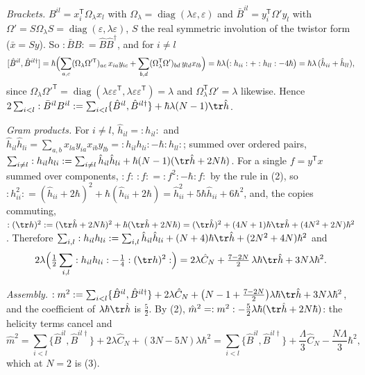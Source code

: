 \emph{Brackets.} $B^{il} = x_{i}^{\mathsf T}\Omega_{\lambda}x_{l}$ with $\Omega_{\lambda} = \operatorname{diag}(\lambda\varepsilon, \varepsilon)$ and $\bar{B}^{il} = y_{i}^{\mathsf T}\Omega'y_{l}$ with $\Omega' = S\Omega_{\lambda}S = \operatorname{diag}(\varepsilon, \lambda\varepsilon)$, $S$ the real symmetric involution of the twistor form ($\bar{x} = Sy$). So $:\bar{B}B: = \hat{B}\hat{B}^{\dagger}$, and for $i \ne l$
\[
[\hat{B}^{il}, \hat{B}^{il\dagger}] = \hbar\Bigl(\sum_{a,c}(\Omega_{\lambda}\Omega'^{\mathsf T})_{ac}\,x_{ia}y_{ic} + \sum_{b,d}(\Omega_{\lambda}^{\mathsf T}\Omega')_{bd}\,y_{ld}x_{lb}\Bigr) = \hbar\lambda\bigl(:h_{ii}: + :h_{ll}: - 4\hbar\bigr) = \hbar\lambda\,(\hat{h}_{ii} + \hat{h}_{ll}),
\]
since $\Omega_{\lambda}\Omega'^{\mathsf T} = \operatorname{diag}(\lambda\varepsilon\varepsilon^{\mathsf T}, \lambda\varepsilon\varepsilon^{\mathsf T}) = \lambda$ and $\Omega_{\lambda}^{\mathsf T}\Omega' = \lambda$ likewise. Hence $2\sum_{i<l}:\bar{B}^{il}B^{il}: = \sum_{i<l}\{\hat{B}^{il}, \hat{B}^{il\dagger}\} + \hbar\lambda(N - 1)\tr\hat{h}$.

\emph{Gram products.} For $i \ne l$, $\hat{h}_{il} = :h_{il}:$ and $\hat{h}_{il}\hat{h}_{li} = \sum_{a,b}x_{la}y_{ia}x_{ib}y_{lb} = :h_{il}h_{li}: - \hbar:h_{ll}:$; summed over ordered pairs, $\sum_{i\ne l}:h_{il}h_{li}: = \sum_{i\ne l}\hat{h}_{il}\hat{h}_{li} + \hbar(N - 1)(\tr\hat{h} + 2N\hbar)$. For a single $f = y^{\mathsf T}x$ summed over components, $:f:\,:f: = :f^{2}: - \hbar:f:$ by the rule in (2), so $:h_{ii}^{2}: = (\hat{h}_{ii} + 2\hbar)^{2} + \hbar(\hat{h}_{ii} + 2\hbar) = \hat{h}_{ii}^{2} + 5\hbar\hat{h}_{ii} + 6\hbar^{2}$, and, the copies commuting, $:(\tr h)^{2}: = (\tr\hat{h} + 2N\hbar)^{2} + \hbar(\tr\hat{h} + 2N\hbar) = (\tr\hat{h})^{2} + (4N + 1)\hbar\tr\hat{h} + (4N^{2} + 2N)\hbar^{2}$. Therefore $\sum_{i,l}:h_{il}h_{li}: = \sum_{i,l}\hat{h}_{il}\hat{h}_{li} + (N + 4)\hbar\tr\hat{h} + (2N^{2} + 4N)\hbar^{2}$ and
\[
2\lambda\Bigl(\tfrac12\sum_{i,l}:h_{il}h_{li}: - \tfrac14:(\tr h)^{2}:\Bigr) = 2\lambda\hat{C}_{N} + \tfrac{7 - 2N}{2}\,\lambda\hbar\tr\hat{h} + 3N\lambda\hbar^{2}.
\]

\emph{Assembly.} $:m^{2}: = \sum_{i<l}\{\hat{B}^{il}, \hat{B}^{il\dagger}\} + 2\lambda\hat{C}_{N} + \bigl(N - 1 + \tfrac{7 - 2N}{2}\bigr)\lambda\hbar\tr\hat{h} + 3N\lambda\hbar^{2}$, and the coefficient of $\lambda\hbar\tr\hat{h}$ is $\tfrac52$. By (2), $\hat{m}^{2} = :m^{2}: - \tfrac52\lambda\hbar(\tr\hat{h} + 2N\hbar)$: the helicity terms cancel and
\[
\hat{m}^{2} = \sum_{i<l}\{\hat{B}^{il}, \hat{B}^{il\dagger}\} + 2\lambda\hat{C}_{N} + (3N - 5N)\lambda\hbar^{2} = \sum_{i<l}\{\hat{B}^{il}, \hat{B}^{il\dagger}\} + \frac{\Lambda}{3}\hat{C}_{N} - \frac{N\Lambda}{3}\hbar^{2},
\]
which at $N = 2$ is (3).

